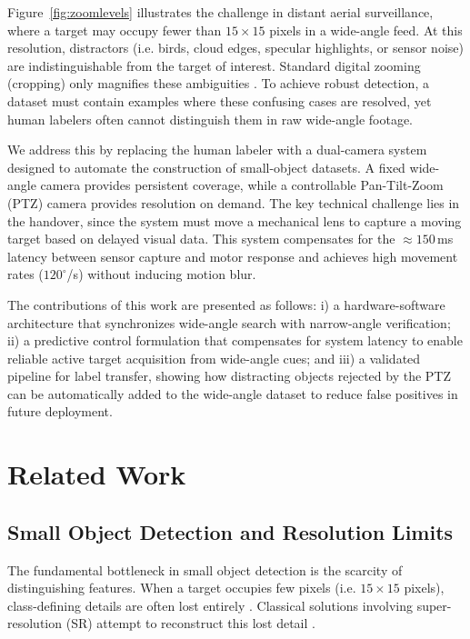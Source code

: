 \documentclass[conf]{new-aiaa}
\begin{document}
Figure~\ref{fig:zoomlevels} illustrates the challenge in distant aerial surveillance, where a target may occupy fewer than $15 \times 15$ pixels in a wide-angle feed. At this resolution, distractors (i.e. birds, cloud edges, specular highlights, or sensor noise) are indistinguishable from the target of interest. Standard digital zooming (cropping) only magnifies these ambiguities \cite{zhang2019zoom}. To achieve robust detection, a dataset must contain examples where these confusing cases are resolved, yet human labelers often cannot distinguish them in raw wide-angle footage.
\par
We address this by replacing the human labeler with a dual-camera system designed to automate the construction of small-object datasets. A fixed wide-angle camera provides persistent coverage, while a controllable Pan-Tilt-Zoom (PTZ) camera provides resolution on demand. The key technical challenge lies in the handover, since the system must move a mechanical lens to capture a moving target based on delayed visual data. This system compensates for the $\approx 150$\,ms latency between sensor capture and motor response and achieves high movement rates ($120^\circ$/s) without inducing motion blur.
\par
The contributions of this work are presented as follows: i) a hardware-software architecture that synchronizes wide-angle search with narrow-angle verification; ii) a predictive control formulation that compensates for system latency to enable reliable active target acquisition from wide-angle cues; and iii) a validated pipeline for label transfer, showing how distracting objects rejected by the PTZ can be automatically added to the wide-angle dataset to reduce false positives in future deployment.

\section{Related Work}

\subsection{Small Object Detection and Resolution Limits}
The fundamental bottleneck in small object detection is the scarcity of distinguishing features. When a target occupies few pixels (i.e. $15 \times 15$ pixels), class-defining details are often lost entirely \cite{nikouei2024smallobj}. Classical solutions involving super-resolution (SR) attempt to reconstruct this lost detail \cite{mahaur2022superres}. 
\end{document}
